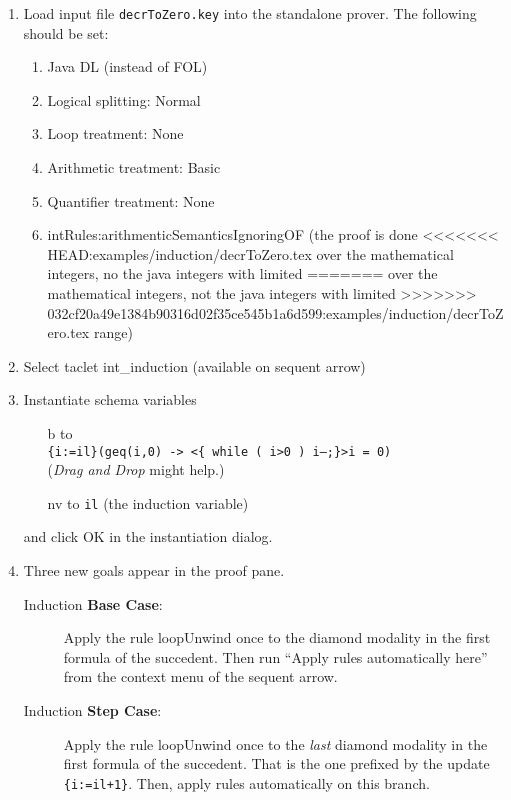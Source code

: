 \documentclass[11pt]{article}
\begin{document}
\begin{enumerate}
\item Load input file \texttt{decrToZero.key} into the standalone
  prover. The following should be set:
  \begin{enumerate}
  \item Java DL (instead of FOL)
  \item Logical splitting: Normal
  \item Loop treatment: None
  \item Arithmetic treatment: Basic
  \item Quantifier treatment: None
  \item intRules:arithmenticSemanticsIgnoringOF (the proof is done
<<<<<<< HEAD:examples/induction/decrToZero.tex
    over the mathematical integers, no the java integers with limited
=======
    over the mathematical integers, not the java integers with limited
>>>>>>> 032cf20a49e1384b90316d02f35ce545b1a6d599:examples/induction/decrToZero.tex
    range)
  \end{enumerate}

\item Select taclet \textsf{int\_induction} (available on sequent
  arrow)

\item Instantiate schema variables 
  \begin{itemize} 
  \item[\textsf{b}] to \\ \texttt{\{i:=il\}(geq(i,0) -> <\{ while
      ( i>0 )  i--;\}>i = 0)}\\
    (\emph{Drag and Drop} might help.)
  \item[\textsf{nv}] to \texttt{il} (the induction variable) 
  \end{itemize}
  and click \textsf{OK} in the instantiation dialog.


\item Three new goals appear in the proof pane.

  \begin{description}
  \item[Induction \textbf{Base Case}:] Apply the rule
    \textsf{loopUnwind} once to the diamond modality in the first
    formula of the succedent. Then run ``Apply rules automatically
    here'' from the context menu of the sequent arrow.

  \item[Induction \textbf{Step Case}:] Apply the rule
    \textsf{loopUnwind} once to the \emph{last} diamond modality in
    the first formula of the succedent. That is the one prefixed by
    the update \texttt{\{i:=il+1\}}. Then, apply rules automatically on this
    branch.


\end{description}
\end{enumerate}
\end{document}
